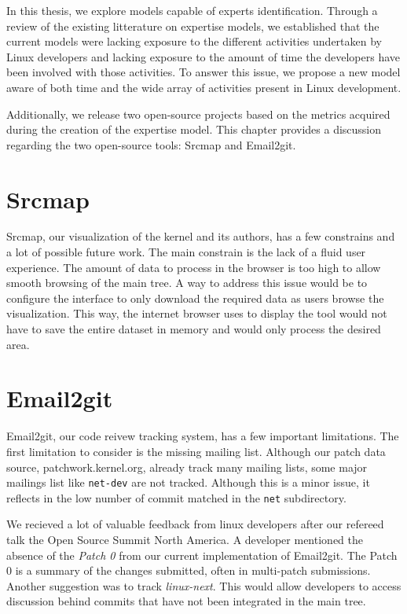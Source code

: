 \label{sec:general-discussion}


In this thesis, we explore models capable of experts identification. Through a review of the existing litterature on expertise models, we established that the current models were lacking exposure to the different activities undertaken by Linux developers and lacking exposure to the amount of time the developers have been involved with those activities. To answer this issue, we propose a new model aware of both time and the wide array of activities present in Linux development. 

Additionally, we release two open-source projects based on the metrics acquired during the creation of the expertise model. This chapter provides a discussion regarding the two open-source tools: Srcmap and Email2git.



\section{Srcmap}

Srcmap, our visualization of the kernel and its authors, has a few constrains and a lot of possible future work. The main constrain is the lack of a fluid user experience. The amount of data to process in the browser is too high to allow smooth browsing of the main tree. A way to address this issue would be to configure the interface to only download the required data as users browse the visualization. This way, the internet browser uses to display the tool would not have to save the entire dataset in memory and would only process the desired area. 



\section{Email2git}

Email2git, our code reivew tracking system, has a few important limitations. The first limitation to consider is the missing mailing list. Although our patch data source, patchwork.kernel.org, already track many mailing lists, some major mailings list like \texttt{net-dev} are not tracked. Although this is a minor issue, it reflects in the low number of commit matched in the \texttt{net} subdirectory. 

We recieved a lot of valuable feedback from linux developers after our refereed talk the Open Source Summit North America. A developer mentioned the absence of the \textit{Patch 0} from our current implementation of Email2git. The Patch 0 is a summary of the changes submitted, often in multi-patch submissions. Another suggestion was to track \textit{linux-next}. This would allow developers to access discussion behind commits that have not been integrated in the main tree. 

